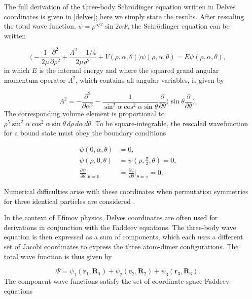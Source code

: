 The full derivation of the three-body Schr{\"o}dinger equation written in Delves coordinates is given in \cref{delves}; here we simply state the results. After rescaling the total wave function, $\psi = \rho^{5/2}\sin2\alpha\Psi$, the Schr{\"o}dinger equation can be written

\begin{equation}
\bigg(-\frac{1}{2\mu}\frac{\partial^2}{\partial\rho^2} + \frac{\Lambda^2 - 1/4}{2\mu\rho^2} + V(\rho,\alpha,\theta)\bigg) \psi(\rho,\alpha,\theta) = E \psi(\rho,\alpha,\theta),
\end{equation}
in which $E$ is the internal energy and where the squared grand angular momentum operator $\Lambda^2$, which contains all angular variables, is given by

\begin{equation}
\Lambda^2 = -\frac{\partial^2}{\partial\alpha^2} - \frac{1}{\sin^2\alpha\cos^2\alpha\sin\theta} \frac{\partial}{\partial\theta} \bigg( \sin\theta \frac{\partial}{\partial\theta}\bigg).
\end{equation}
The corresponding volume element is proportional to $\rho^5\sin^2\alpha\cos^2\alpha\sin\theta \,d\rho\,d\alpha\, d\theta$. To be square-integrable, the rescaled wavefunction for a bound state must obey the boundary conditions

\begin{align}
\psi(0,\alpha,\theta) &= 0,\\
\psi(\rho,0,\theta)    &= \psi(\rho,\frac{\pi}{2},\theta) = 0,\\
\frac{\partial\psi}{\partial\theta}\bigg\rvert_{\theta = 0} &= \frac{\partial\psi}{\partial\theta}\bigg\rvert_{\theta = \pi} = 0.
\end{align} 

Numerical difficulties arise with these coordinates when permutation symmetries for three identical particles are considered \cite{rimondo_berman_lin}. 

In the context of Efimov physics, Delves coordinates are often used for derivations in conjunction with the Faddeev equations. The three-body wave equation is then expressed as a sum of components, which each uses a different set of Jacobi coordinates to express the three atom-dimer configurations.  The total wave function is thus given by

\begin{equation}\label{eq:totwave}
\Psi = \psi_{1}(\mathbf{r}_1,\mathbf{R}_1)+\psi_{2}(\mathbf{r}_2,\mathbf{R}_2)+\psi_{3}(\mathbf{r}_3,\mathbf{R}_3).
\end{equation}
The component wave functions satisfy the set of coordinate space Faddeev equations

